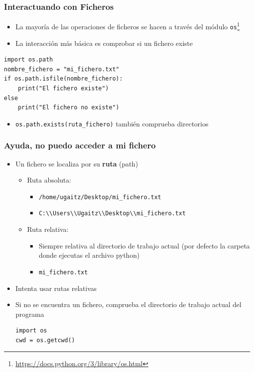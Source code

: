\documentclass[11pt]{beamer}
\begin{document}
\begin{frame}[fragile]\frametitle{Interactuando con Ficheros}
\begin{itemize}
\item La mayoría de las operaciones de ficheros se hacen a través del módulo \lstinline|os|\footnote{\href{https://docs.python.org/3/library/os.html}{https://docs.python.org/3/library/os.html}}
\item La interacción más básica es comprobar si un fichero existe
\end{itemize}
\begin{lstlisting}[basicstyle=\small]
import os.path
nombre_fichero = "mi_fichero.txt"
if os.path.isfile(nombre_fichero):
    print("El fichero existe")
else
    print("El fichero no existe")
\end{lstlisting}
\begin{itemize}
\item \lstinline|os.path.exists(ruta_fichero)| también comprueba directorios
\end{itemize}
\end{frame}

\begin{frame}[fragile]\frametitle{Ayuda, no puedo acceder a mi fichero}
\begin{itemize}
\item Un fichero se localiza por su \textbf{ruta} (path)
    \begin{itemize}
    \item Ruta absoluta: 
        \begin{itemize}
        \item \verb*|/home/ugaitz/Desktop/mi_fichero.txt|
        \item \verb*|C:\\Users\\Ugaitz\\Desktop\\mi_fichero.txt|
        \end{itemize}
    \item Ruta relativa:
        \begin{itemize}
        \item Siempre relativa al directorio de trabajo actual (por defecto la carpeta donde ejecutas el archivo python)
        \item \verb*|mi_fichero.txt|
        \end{itemize}
    \end{itemize}
\item Intenta usar rutas relativas
\item Si no se encuentra un fichero, comprueba el directorio de trabajo actual del programa
\begin{lstlisting}[basicstyle=\small]
import os
cwd = os.getcwd()
\end{lstlisting}
\end{itemize}
\end{frame}
\end{document}
